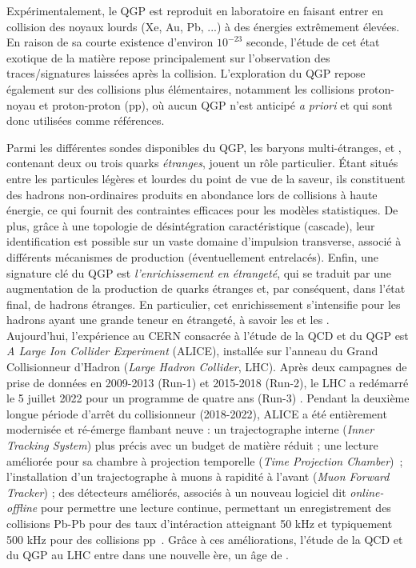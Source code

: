 Expérimentalement, le QGP est reproduit en laboratoire en faisant entrer en collision des noyaux lourds (Xe, Au, Pb, ...) à des énergies extrêmement élevées. En raison de sa courte existence d'environ $10^{-23}$ seconde, l'étude de cet état exotique de la matière repose principalement sur l'observation des traces/signatures laissées après la collision. L'exploration du QGP repose également sur des collisions plus élémentaires, notamment les collisions proton-noyau et proton-proton (pp), où aucun QGP n'est anticipé \textit{a priori} et qui sont donc utilisées comme références.

Parmi les différentes sondes disponibles du QGP, les baryons multi-étranges, \rmXi et \rmOmega, contenant deux ou trois quarks \textit{étranges}, jouent un rôle particulier. Étant situés entre les particules légères et lourdes du point de vue de la saveur, ils constituent des hadrons non-ordinaires produits en abondance lors de collisions à haute énergie, ce qui fournit des contraintes efficaces pour les modèles statistiques. De plus, grâce à une topologie de désintégration caractéristique (cascade), leur identification est possible sur un vaste domaine d'impulsion transverse, associé à différents mécanismes de production (éventuellement entrelacés). Enfin, une signature clé du QGP est \textit{l'enrichissement en étrangeté}, qui se traduit par une augmentation de la production de quarks étranges et, par conséquent, dans l'état final, de hadrons étranges. En particulier, cet enrichissement s'intensifie pour les hadrons ayant une grande teneur en étrangeté, à savoir les \rmXi et les \rmOmega.\\

Aujourd'hui, l'expérience au CERN consacrée à l'étude de la QCD et du QGP est \textit{A Large Ion Collider Experiment} (ALICE), installée sur l'anneau du Grand Collisionneur d'Hadron (\textit{Large Hadron Collider}, LHC). Après deux campagnes de prise de données en 2009-2013 (Run-1) et 2015-2018 (Run-2), le LHC a redémarré le 5 juillet 2022 pour un programme de quatre ans (Run-3) \cite{cernThirdRunLarge2023}. Pendant la deuxième longue période d'arrêt du collisionneur (2018-2022), ALICE a été entièrement modernisée et ré-émerge flambant neuve : un trajectographe interne (\textit{Inner Tracking System}) plus précis avec un budget de matière réduit ; une lecture améliorée pour sa chambre à projection temporelle (\textit{Time Projection Chamber})~; l'installation d'un trajectographe à muons à rapidité à l'avant (\textit{Muon Forward Tracker}) ; des détecteurs améliorés, associés à un nouveau logiciel dit \textit{online-offline} pour permettre une lecture continue, permettant un enregistrement des collisions Pb-Pb pour des taux d'intéraction atteignant 50 kHz et typiquement 500 kHz pour des collisions pp~\cite{alicecollaborationUpgradeALICEExperiment2014}. Grâce à ces améliorations, l'étude de la QCD et du QGP au LHC entre dans une nouvelle ère, un âge de .

